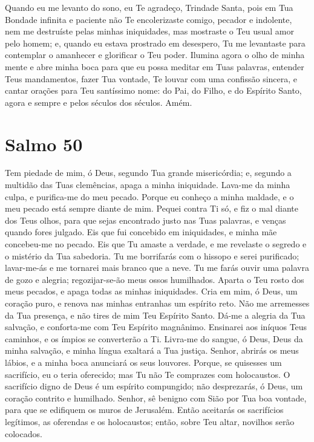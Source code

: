 \documentclass{subfiles}
\begin{document}
\mercy{} 



Quando eu me levanto do sono, eu Te agradeço, Trindade Santa, pois em 
Tua Bondade infinita e paciente não Te encolerizaste comigo, pecador e 
indolente, nem me destruíste pelas minhas iniquidades, mas mostraste o Teu 
usual amor pelo homem; e, quando eu estava prostrado em desespero, Tu me 
levantaste para contemplar o amanhecer e glorificar o Teu poder. Ilumina 
agora o olho de minha mente e abre minha boca para que eu possa meditar 
em Tuas palavras, entender Teus mandamentos, fazer Tua vontade, Te louvar 
com uma confissão sincera, e cantar orações para Teu santíssimo nome: do Pai, 
do Filho, e do Espírito Santo, agora e sempre e pelos séculos dos séculos. 
Amém. 


\section*{Salmo 50}

Tem piedade de mim, ó Deus, segundo Tua grande misericórdia; e, segundo a
multidão das Tuas clemências, apaga a minha iniquidade. Lava-me da minha culpa,
e purifica-me do meu pecado. Porque eu conheço a minha maldade, e o meu pecado
está sempre diante de mim. Pequei contra Ti só, e fiz o mal diante dos Teus
olhos, para que sejas encontrado justo nas Tuas palavras, e venças quando fores
julgado. Eis que fui concebido em iniquidades, e minha mãe concebeu-me no
pecado. Eis que Tu amaste a verdade, e me revelaste o segredo e o mistério da
Tua sabedoria. Tu me borrifarás com o hissopo e serei purificado; lavar-me-ás e
me tornarei mais branco que a neve. Tu me farás ouvir uma palavra de gozo e
alegria; regozijar-se-ão meus ossos humilhados. Aparta o Teu rosto dos meus
pecados, e apaga todas as minhas iniquidades. Cria em mim, ó Deus, um coração
puro, e renova nas minhas entranhas um espírito reto. Não me arremesses da Tua
presença, e não tires de mim Teu Espírito Santo. Dá-me a alegria da Tua
salvação, e conforta-me com Teu Espírito magnânimo. Ensinarei aos iníquos Teus
caminhos, e os ímpios se converterão a Ti. Livra-me do sangue, ó Deus, Deus da
minha salvação, e minha língua exaltará a Tua justiça. Senhor, abrirás os meus
lábios, e a minha boca anunciará os seus louvores. Porque, se quisesses um
sacrifício, eu o teria oferecido; mas Tu não Te comprazes com holocaustos. O
sacrifício digno de Deus é um espírito compungido; não desprezarás, ó Deus, um
coração contrito e humilhado. Senhor, sê benigno com Sião por Tua boa vontade,
para que se edifiquem os muros de Jerusalém. Então aceitarás os sacrifícios
legítimos, as oferendas e os holocaustos; então, sobre Teu altar, novilhos serão
colocados.
\end{document}
